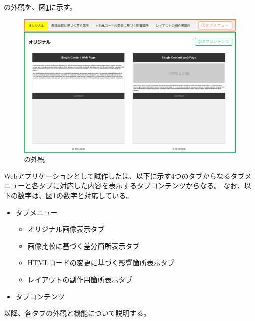 \toolName の外観を、図\ref{fig: Appearance}に示す。
\begin{figure}[tp]
	\begin{center}
		\includegraphics[width=1.0\columnwidth]{image/3_Outline_Appearance.png}
		\caption{\toolName の外観}
		\label{fig: Appearance}
	\end{center}
\end{figure}
Webアプリケーションとして試作した\toolName は、以下に示す4つのタブからなるタブメニューと各タブに対応した内容を表示するタブコンテンツからなる。
なお、以下の数字は、図\ref{fig: Appearance}の数字と対応している。
\begin{itemize}
	\item[①] タブメニュー
	      \begin{itemize}
		      \item オリジナル画像表示タブ
		      \item 画像比較に基づく差分箇所表示タブ
		      \item HTMLコードの変更に基づく影響箇所表示タブ
		      \item レイアウトの副作用箇所表示タブ
	      \end{itemize}
	\item[②] タブコンテンツ
\end{itemize}
\par
以降、各タブの外観と機能について説明する。



